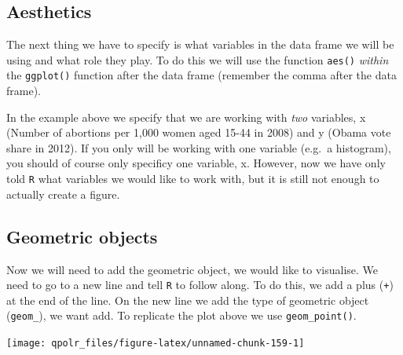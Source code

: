 \documentclass[12pt,oneside]{reedthesis}
\theoremstyle{definition}
\theoremstyle{definition}
\theoremstyle{definition}
\theoremstyle{remark}
\begin{document}
  \subsection{Aesthetics}\label{aesthetics}
  
  The next thing we have to specify is what variables in the data frame we
  will be using and what role they play. To do this we will use the
  function \texttt{aes()} \emph{within} the \texttt{ggplot()} function
  after the data frame (remember the comma after the data frame).
  \begin{Shaded}
  \begin{Highlighting}[]
  \NormalTok{(}
  \end{Highlighting}
  \end{Shaded}
  In the example above we specify that we are working with \emph{two}
  variables, x (Number of abortions per 1,000 women aged 15-44 in 2008)
  and y (Obama vote share in 2012). If you only will be working with one
  variable (e.g.~a histogram), you should of course only specificy one
  variable, x. However, now we have only told \texttt{R} what variables we
  would like to work with, but it is still not enough to actually create a
  figure.
  
  \subsection{Geometric objects}\label{geometric-objects}
  
  Now we will need to add the geometric object, we would like to
  visualise. We need to go to a new line and tell \texttt{R} to follow
  along. To do this, we add a plus (\texttt{+}) at the end of the line. On
  the new line we add the type of geometric object (\texttt{geom\_}), we
  want add. To replicate the plot above we use \texttt{geom\_point()}.
  \begin{Shaded}
  \begin{Highlighting}[]
  \NormalTok{(}\OperatorTok{+}
  \StringTok{  }\NormalTok{()}
  \end{Highlighting}
  \end{Shaded}
  \begin{center}\texttt{[image: qpolr\_files/figure-latex/unnamed-chunk-159-1]} \end{center}
  
\end{document}
